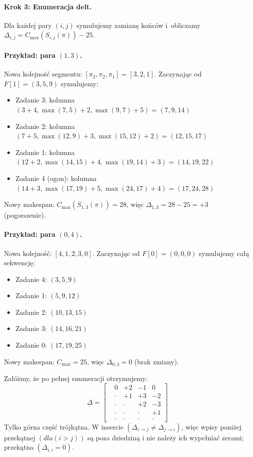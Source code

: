 \paragraph{Krok 3: Enumeracja delt.}

Dla każdej pary $(i,j)$ symulujemy zamianę końców i~obliczamy $\Delta_{i,j} = C_{\max}(S_{i,j}(\pi)) - 25$.

\paragraph{Przykład: para $(1,3)$.}
Nowa kolejność segmentu: $[\pi_3, \pi_2, \pi_1] = [3, 2, 1]$.
Zaczynając od $F[1] = (3, 5, 9)$ symulujemy:
\begin{itemize}
  \item Zadanie 3: kolumna $(3+4, \max(7,5)+2, \max(9,7)+5) = (7, 9, 14)$
  \item Zadanie 2: kolumna $(7+5, \max(12,9)+3, \max(15,12)+2) = (12, 15, 17)$
  \item Zadanie 1: kolumna $(12+2, \max(14,15)+4, \max(19,14)+3) = (14, 19, 22)$
  \item Zadanie 4 (ogon): kolumna $(14+3, \max(17,19)+5, \max(24,17)+4) = (17, 24, 28)$
\end{itemize}
Nowy makespan: $C_{\max}(S_{1,3}(\pi)) = 28$, więc $\Delta_{1,3} = 28 - 25 = +3$ (pogorszenie).

\paragraph{Przykład: para $(0,4)$.}
Nowa kolejność: $[4, 1, 2, 3, 0]$.
Zaczynając od $F[0] = (0, 0, 0)$ symulujemy całą sekwencję:
\begin{itemize}
  \item Zadanie 4: $(3, 5, 9)$
  \item Zadanie 1: $(5, 9, 12)$
  \item Zadanie 2: $(10, 13, 15)$
  \item Zadanie 3: $(14, 16, 21)$
  \item Zadanie 0: $(17, 19, 25)$
\end{itemize}
Nowy makespan: $C_{\max} = 25$, więc $\Delta_{0,4} = 0$ (brak zmiany).

Załóżmy, że po pełnej enumeracji otrzymujemy:
\begin{equation}\label{eq_delat_matrix}
\Delta = \begin{bmatrix}
 & 0 & +2 & -1 & 0 \\
 & \cdot & +1 & +3 & -2 \\
 & \cdot & \cdot & +2 & -3 \\
 & \cdot & \cdot &\cdot & +1 \\
 & \cdot & \cdot & \cdot & \cdot
\end{bmatrix}
\end{equation}
Tylko górna część trójkątna. W insercie $(\Delta_{i\to j} \neq \Delta_{j\to i})$, więc wpisy poniżej przekątnej $(dla (i>j))$ są poza dziedziną i nie należy ich wypełniać zerami; przekątna $(\Delta_{i,i}=0)$.

